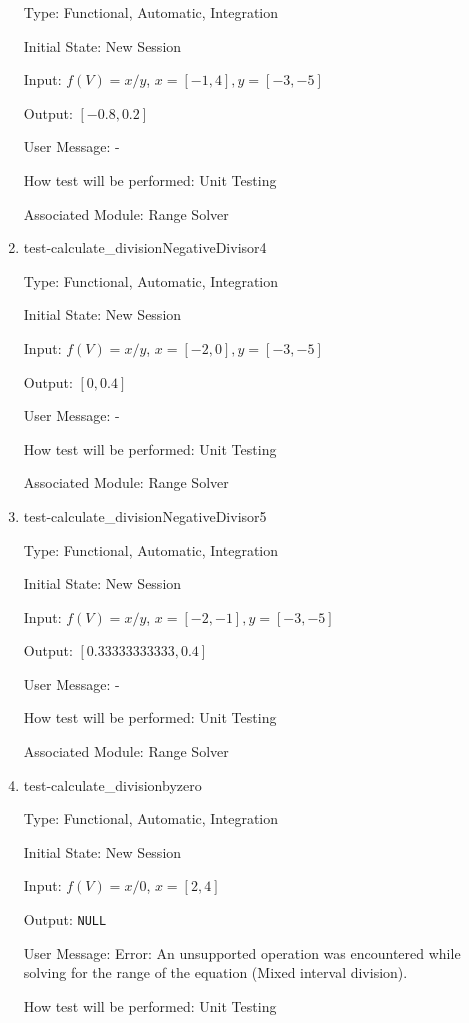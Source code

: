 \documentclass[12pt, titlepage]{article}
\begin{document}
\begin{enumerate}
	Type: Functional, Automatic, Integration
	
	Initial State: New Session
	
	Input: $f(V) = x / y$, $x = [-1,4], y = [-3,-5]$
	
	Output: $[-0.8,0.2]$
	
	User Message: - 
	
	How test will be performed: Unit Testing
	
	Associated Module: Range Solver\\
	
	\item{test-calculate\_divisionNegativeDivisor4}
	
	Type: Functional, Automatic, Integration
	
	Initial State: New Session
	
	Input: $f(V) = x / y$, $x = [-2,0], y = [-3,-5]$
	
	Output: $[0,0.4]$
	
	User Message: - 
	
	How test will be performed: Unit Testing
	
	Associated Module: Range Solver\\
	
	\item{test-calculate\_divisionNegativeDivisor5}
	
	Type: Functional, Automatic, Integration
	
	Initial State: New Session
	
	Input: $f(V) = x / y$, $x = [-2,-1], y = [-3,-5]$
	
	Output: $[0.33333333333,0.4]$
	
	User Message: - 
	
	How test will be performed: Unit Testing
	
	Associated Module: Range Solver \\
	
	\item{test-calculate\_divisionbyzero}
	
	Type: Functional, Automatic, Integration
	
	Initial State: New Session
	
	Input: $f(V) = x / 0$, $x = [2,4]$
	
	Output: \texttt{NULL}
	
	User Message: Error: An unsupported operation was encountered while solving 
	for the range of the equation (Mixed interval division).
	
	How test will be performed: Unit Testing
	

\end{enumerate}
\end{document}
